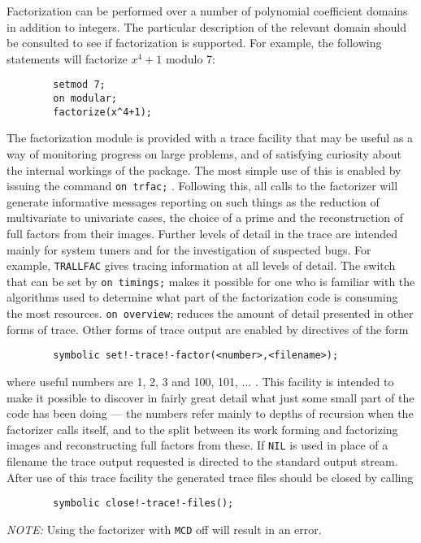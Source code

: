 Factorization can be performed over a number of polynomial coefficient
domains in addition to integers. The particular description of the relevant
domain should be consulted to see if factorization is supported. For
example, the following statements will factorize $x^{4}+1$ modulo 7:
\begin{verbatim}
        setmod 7;
        on modular;
        factorize(x^4+1);
\end{verbatim}
\hypertarget{switch:TRFAC}{}
The factorization module is provided with a trace facility that may be useful
as a way of monitoring progress on large problems, and of satisfying
curiosity about the internal workings of the package. The most simple use
of this is enabled by issuing the {\REDUCE} command
{\tt on trfac;} .
Following this, all calls to the factorizer will generate informative
messages reporting on such things as the reduction of multivariate to
univariate cases, the choice of a prime and the reconstruction of full
factors from their images.  Further levels of detail in the trace are
intended mainly for system tuners and for the investigation of suspected
bugs.  For example, {\tt TRALLFAC} gives tracing information at all levels
of detail.  The switch that can be set by {\tt on timings;} makes it
possible for one who is familiar with the algorithms used to determine
what part of the factorization code is consuming the most resources.
{\tt on overview}; reduces the amount of detail presented in other forms of
trace.  Other forms of trace output are enabled by directives of the form
\begin{verbatim}
        symbolic set!-trace!-factor(<number>,<filename>);
\end{verbatim}
where useful numbers are 1, 2, 3 and 100, 101, ... .  This facility is
intended to make it possible to discover in fairly great detail what just
some small part of the code has been doing --- the numbers refer mainly to
depths of recursion when the factorizer calls itself, and to the split
between its work forming and factorizing images and reconstructing full
factors from these.  If {\tt NIL} is used in place of a filename the trace
output requested is directed to the standard output stream.  After use of
this trace facility the generated trace files should be closed by calling
\begin{verbatim}
        symbolic close!-trace!-files();
\end{verbatim}
{\it NOTE:} Using the factorizer with {\tt MCD} off will
result in an error.

